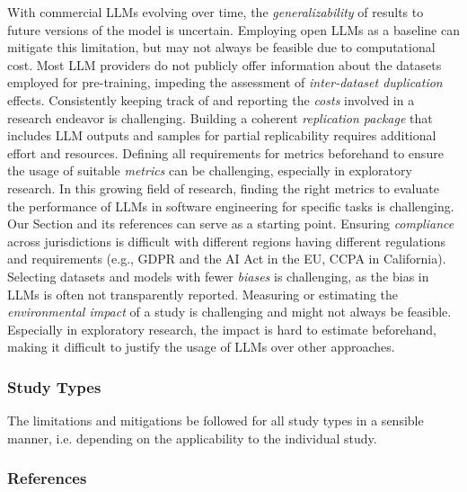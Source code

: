 With commercial LLMs evolving over time, the \emph{generalizability} of results to future versions of the model is uncertain.
Employing open LLMs as a baseline can mitigate this limitation, but may not always be feasible due to computational cost.
Most LLM providers do not publicly offer information about the datasets employed for pre-training, impeding the assessment of \emph{inter-dataset duplication} effects.
Consistently keeping track of and reporting the \emph{costs} involved in a research endeavor is challenging.
Building a coherent \emph{replication package} that includes LLM outputs and samples for partial replicability requires additional effort and resources.
Defining all requirements for metrics beforehand to ensure the usage of suitable \emph{metrics} can be challenging, especially in exploratory research.
In this growing field of research, finding the right metrics to evaluate the performance of LLMs in software engineering for specific tasks is challenging.
Our Section \benchmarksmetrics and its references can serve as a starting point.
Ensuring \emph{compliance} across jurisdictions is difficult with different regions having different regulations and requirements (e.g., GDPR and the AI Act in the EU, CCPA in California).
Selecting datasets and models with fewer \emph{biases} is challenging, as the bias in LLMs is often not transparently reported.
Measuring or estimating the \emph{environmental impact} of a study is challenging and might not always be feasible.
Especially in exploratory research, the impact is hard to estimate beforehand, making it difficult to justify the usage of LLMs over other approaches.

\subsubsection{Study Types}

The limitations and mitigations \should be followed for all study types in a sensible manner, i.e. depending on the applicability to the individual study.

\subsubsection{References}





